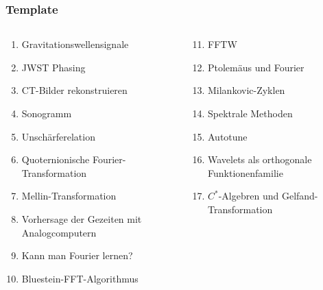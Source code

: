 %
%
%
\bgroup
\begin{frame}[t]
\setlength{\abovedisplayskip}{5pt}
\setlength{\belowdisplayskip}{5pt}
\frametitle{Template}
\vspace{-20pt}
\begin{columns}[t,onlytextwidth]
\begin{column}{0.48\textwidth}
\begin{enumerate}
\item<2-> Gravitationswellensignale
\item<3-> JWST Phasing
\item<4-> CT-Bilder rekonstruieren
\item<5-> Sonogramm
\item<6-> Unschärferelation
\item<7-> Quoternionische Fourier-Transformation
\item<8-> Mellin-Transformation
\item<9-> Vorhersage der Gezeiten mit Analogcomputern
\item<10-> Kann man Fourier lernen?
\item<11-> Bluestein-FFT-Algorithmus
\end{enumerate}
\end{column}
\begin{column}{0.48\textwidth}
\begin{enumerate}
\setcounter{enumi}{10}
\item<12-> FFTW
\item<13-> Ptolemäus und Fourier
\item<14-> Milankovic-Zyklen
\item<15-> Spektrale Methoden
\item<16-> Autotune
\item<17-> Wavelets als orthogonale Funktionenfamilie
\item<18-> $C^*$-Algebren und Gelfand-Transformation
\end{enumerate}
\end{column}
\end{columns}
\end{frame}
\egroup
